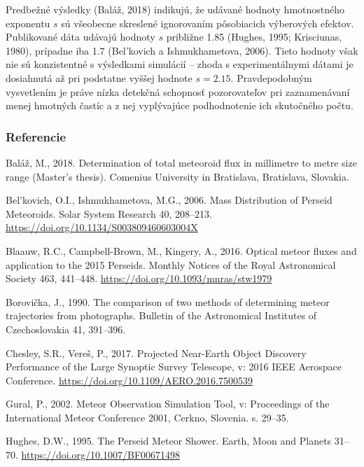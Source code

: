 Predbežné výsledky (Baláž, 2018) indikujú, že udávané hodnoty
hmotnostného exponentu \(s\) sú všeobecne skreslené ignorovaním
pôsobiacich výberových efektov. Publikované dáta udávajú hodnoty \(s\)
približne \num{1.85} (Hughes, 1995; Krisciunas, 1980), prípadne iba
\num{1.7} (Bel'kovich a Ishmukhametova, 2006). Tieto hodnoty však nie sú
konzistentné s výsledkami simulácií -- zhoda s experimentálnymi dátami
je dosiahnutá až pri podstatne vyššej hodnote \(s = \num{2.15}\).
Pravdepodobným vysvetlením je práve nízka detekčná schopnosť
pozorovateľov pri zaznamenávaní menej hmotných častíc a z nej
vyplývajúce podhodnotenie ich skutočného počtu.

\subsubsection*{Referencie}\label{referencie}

\hypertarget{refs}{}
\hypertarget{ref-balaz2018}{}
Baláž, M., 2018. Determination of total meteoroid flux in millimetre to
metre size range (Master's thesis). Comenius University in Bratislava,
Bratislava, Slovakia.

\hypertarget{ref-belkovich2006}{}
Bel'kovich, O.I., Ishmukhametova, M.G., 2006. Mass Distribution of
Perseid Meteoroids. Solar System Research 40, 208--213.
\url{https://doi.org/10.1134/S003809460603004X}

\hypertarget{ref-blaauw2016}{}
Blaauw, R.C., Campbell-Brown, M., Kingery, A., 2016. Optical meteor
fluxes and application to the 2015 Perseids. Monthly Notices of the
Royal Astronomical Society 463, 441--448.
\url{https://doi.org/10.1093/mnras/stw1979}

\hypertarget{ref-borovicka1990}{}
Borovička, J., 1990. The comparison of two methods of determining meteor
trajectories from photographs. Bulletin of the Astronomical Institutes
of Czechoslovakia 41, 391--396.

\hypertarget{ref-chesley2017}{}
Chesley, S.R., Vereš, P., 2017. Projected Near-Earth Object Discovery
Performance of the Large Synoptic Survey Telescope, v: 2016 IEEE
Aerospace Conference. \url{https://doi.org/10.1109/AERO.2016.7500539}

\hypertarget{ref-gural2002}{}
Gural, P., 2002. Meteor Observation Simulation Tool, v: Proceedings of
the International Meteor Conference 2001, Cerkno, Slovenia. s. 29--35.

\hypertarget{ref-hughes1995}{}
Hughes, D.W., 1995. The Perseid Meteor Shower. Earth, Moon and Planets
31--70. \url{https://doi.org/10.1007/BF00671498}


